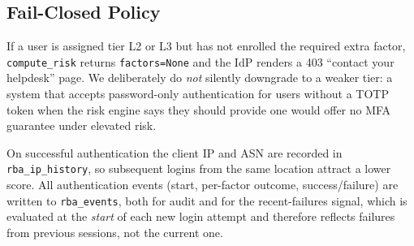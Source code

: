 \subsection{Fail-Closed Policy}
If a user is assigned tier L2 or L3 but has not enrolled the required
extra factor, \texttt{compute\_risk} returns \texttt{factors=None} and the
IdP renders a 403 ``contact your helpdesk'' page.
We deliberately do \emph{not} silently downgrade to a weaker tier:
a system that accepts password-only authentication for users without a
TOTP token when the risk engine says they should provide one would offer
no MFA guarantee under elevated risk.

On successful authentication the client IP and ASN are recorded in
\texttt{rba\_ip\_history}, so subsequent logins from the same location
attract a lower score.
All authentication events (start, per-factor outcome, success/failure) are
written to \texttt{rba\_events}, both for audit and for the recent-failures
signal, which is evaluated at the \emph{start} of each new login attempt
and therefore reflects failures from previous sessions, not the current one.
